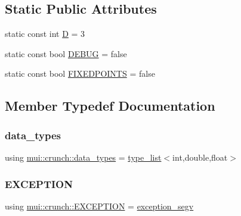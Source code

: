 \subsection*{Static Public Attributes}
\begin{DoxyCompactItemize}
\item 
static const int \hyperlink{structmui_1_1crunch_afa49250ca88779f6d39c0ab585120c2b}{D} = 3
\item 
static const bool \hyperlink{structmui_1_1crunch_acb71ed26e49e2d2f1233b1a08b4992c4}{D\+E\+B\+UG} = false
\item 
static const bool \hyperlink{structmui_1_1crunch_a6a715d5981394944a2ce0a12a7048891}{F\+I\+X\+E\+D\+P\+O\+I\+N\+TS} = false
\end{DoxyCompactItemize}


\subsection{Member Typedef Documentation}
\mbox{\label{structmui_1_1crunch_a0a0e3d165ddd799123f067a61e66c000}} 
\subsubsection{\texorpdfstring{data\+\_\+types}{data\_types}}
{\footnotesize\ttfamily using \hyperlink{structmui_1_1crunch_a0a0e3d165ddd799123f067a61e66c000}{mui\+::crunch\+::data\+\_\+types} =  \hyperlink{structmui_1_1type__list}{type\+\_\+list}$<$int,double,float$>$}

\mbox{\label{structmui_1_1crunch_aec04e38b4a056876eb72c8f570621bd5}} 
\subsubsection{\texorpdfstring{E\+X\+C\+E\+P\+T\+I\+ON}{EXCEPTION}}
{\footnotesize\ttfamily using \hyperlink{structmui_1_1crunch_aec04e38b4a056876eb72c8f570621bd5}{mui\+::crunch\+::\+E\+X\+C\+E\+P\+T\+I\+ON} =  \hyperlink{structmui_1_1exception__segv}{exception\+\_\+segv}}

\mbox{\label{structmui_1_1crunch_a85f2c6d604af24d375168cd481228b70}} 
